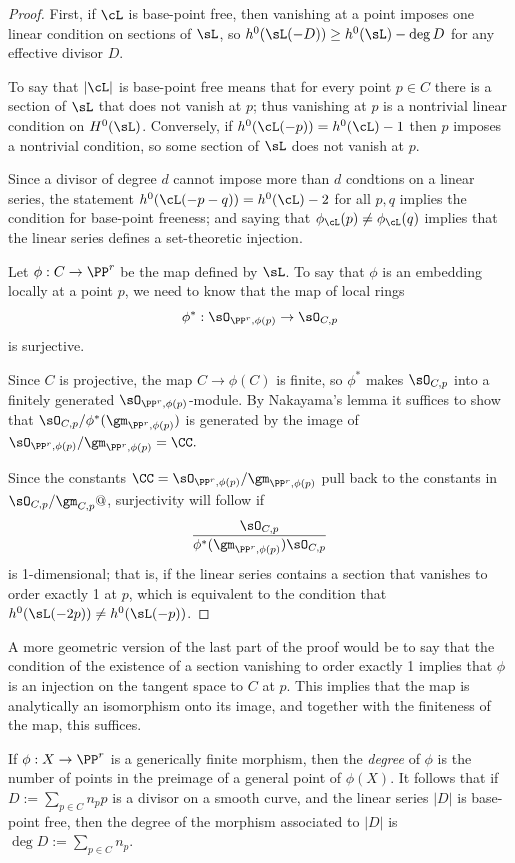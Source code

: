 \begin{proof}
First, if $\cL$ is base-point free, then vanishing at a point imposes one linear condition on sections of $\sL$, so 
$h^0(\sL(-D)) \geq h^0(\sL)-\deg D$ for any
effective divisor $D$.

To say that $|\cL|$ is base-point free means that for every point $p\in C$ there is a section of $\sL$ that does not vanish at $p$; thus vanishing
at $p$ is a nontrivial linear condition on $H^0(\sL)$. Conversely, if $h^0(\cL(-p)) = h^0(\cL) - 1$ then $p$ imposes a nontrivial condition, so
some section of $\sL$ does not vanish at $p$.

Since a divisor of degree $d$ cannot impose more than $d$ condtions on a linear series, the statement $h^0(\cL(-p-q)) = h^0(\cL) - 2$ for all $p, q$ implies the condition for base-point freeness; and saying that $\phi_\cL(p) \neq \phi_\cL(q)$ implies that the linear series defines a set-theoretic injection. 

Let $\phi:C \to \PP^r$ be the map defined by $\sL$. To say that $\phi$  is an embedding locally at a point $p$, we need to know that the map of local rings
$$
\phi^*: \sO_{\PP^r,\phi(p)} \to \sO_{C,p} 
$$
is surjective. 

Since $C$ is projective, the map $C\to \phi(C)$ is finite,
so $\phi^*$ makes $\sO_{C,p}$ into a finitely generated $\sO_{\PP^r,\phi(p)}$-module.
By Nakayama's lemma it suffices to show that 
$\sO_{C,p}/\phi^*(\gm_{\PP^r,\phi(p)})$
is generated by the image of $\sO_{\PP^r,\phi(p)}/\gm_{\PP^r,\phi(p)} = \CC.$

 Since the constants  $\CC =\sO_{\PP^r,\phi(p)}/\gm_{\PP^r,\phi(p)}$ pull back to the constants in
$\sO_{C,p}/\gm_{C,p}@$,
surjectivity will follow if 
$$
\frac{\sO_{C,p}}
{\phi^*(\gm_{\PP^r,\phi(p)})  \sO_{C,p}}
$$
is 1-dimensional; that is, if the linear series contains
a section that vanishes to order exactly 1 at $p$, which is equivalent to the condition
that $h^0(\sL(-2p)) \neq h^0(\sL(-p))$.
\end{proof}

A more geometric version of the last part of the proof would be to say that the condition of the existence of a section
vanishing to order exactly 1 implies that $\phi$ is an injection on the tangent space to $C$ at $p$. This implies that
the map is analytically an isomorphism onto its image, and together with the finiteness of the map, this suffices.

If $\phi:X \to \PP^r$ is a generically finite morphism, then the
\emph{degree} of $\phi$ is the number of points in the preimage of a
general point of $\phi(X)$. It follows that if $D := \sum_{p\in C}
n_pp$ is a divisor on a smooth curve, and the linear series $|D|$ is
base-point free, then the degree of the morphism associated to $|D|$
is $\deg D := \sum_{p\in C} n_p$.
{\meshing\par}

